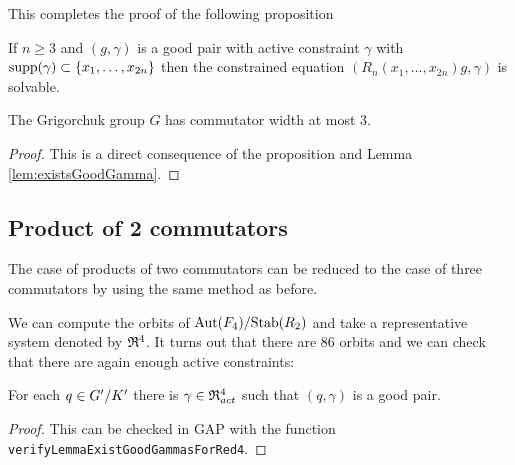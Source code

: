 \documentclass[a4paper,11pt]{amsart}
\begin{document}
This completes the proof of the following proposition
\begin{pro}\label{pro:solvableConstraintedEquations}
 If $n\geq3$ and $(g,\gamma)$ is a good pair with active constraint $\gamma$ with $\textup{supp}(\gamma)\subset\{x_1,\ldots,x_{2n}\}$
 then the constrained equation $(R_n(x_1,\ldots,x_{2n})g,\gamma)$ is solvable. 
\end{pro}
\begin{cor}
 The Grigorchuk group $G$ has commutator width at most $3$.
\end{cor}
\begin{proof}
 This is a direct consequence of the proposition and Lemma \ref{lem:existsGoodGamma}.
\end{proof}

\subsection{Product of 2 commutators}
The case of products of two commutators can be reduced to the case of three commutators by using the same method as before.

We can compute the orbits of ${\textup{Aut}(F_4)/\textup{Stab}(R_2)}$ and take a representative system denoted by $\mathfrak{R}^4$.
It turns out that there are $86$ orbits and we can check that there are again enough active constraints:
\begin{lem} \label{lem:existsGoodGammaForRed4}
 For each $q\in{G'/K'}$ there is $\gamma\in \mathfrak{R}^4_{act}$ such that $(q,\gamma)$ is a 
 good pair.
\end{lem}
\begin{proof}
 This can be checked in GAP with the function \lstinline{verifyLemmaExistGoodGammasForRed4}.
\end{proof}
\end{document}

